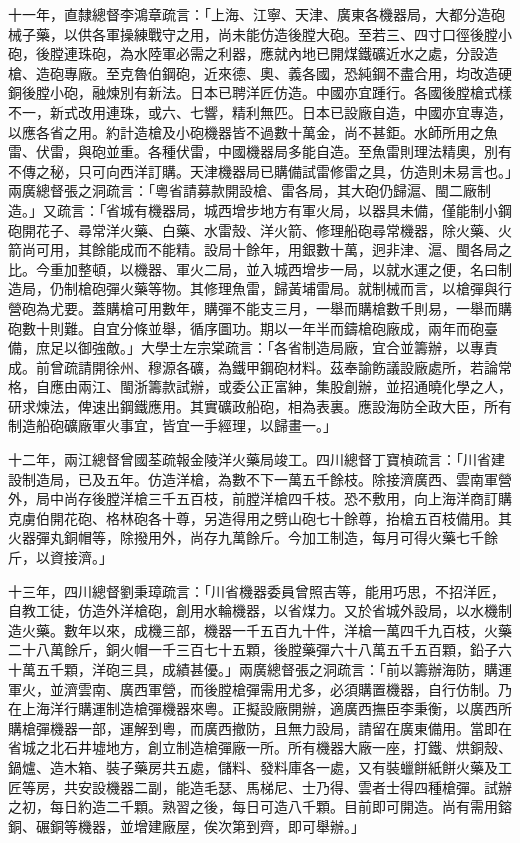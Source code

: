 \begin{pinyinscope}
十一年，直隸總督李鴻章疏言：「上海、江寧、天津、廣東各機器局，大都分造砲械子藥，以供各軍操練戰守之用，尚未能仿造後膛大砲。至若三、四寸口徑後膛小砲，後膛連珠砲，為水陸軍必需之利器，應就內地已開煤鐵礦近水之處，分設造槍、造砲專廠。至克魯伯鋼砲，近來德、奧、義各國，恐純鋼不盡合用，均改造硬銅後膛小砲，融煉別有新法。日本已聘洋匠仿造。中國亦宜踵行。各國後膛槍式樣不一，新式改用連珠，或六、七響，精利無匹。日本已設廠自造，中國亦宜專造，以應各省之用。約計造槍及小砲機器皆不過數十萬金，尚不甚鉅。水師所用之魚雷、伏雷，與砲並重。各種伏雷，中國機器局多能自造。至魚雷則理法精奧，別有不傳之秘，只可向西洋訂購。天津機器局已購備試雷修雷之具，仿造則未易言也。」兩廣總督張之洞疏言：「粵省請募款開設槍、雷各局，其大砲仍歸滬、閩二廠制造。」又疏言：「省城有機器局，城西增步地方有軍火局，以器具未備，僅能制小鋼砲開花子、尋常洋火藥、白藥、水雷殼、洋火箭、修理船砲尋常機器，除火藥、火箭尚可用，其餘能成而不能精。設局十餘年，用銀數十萬，迥非津、滬、閩各局之比。今重加整頓，以機器、軍火二局，並入城西增步一局，以就水運之便，名曰制造局，仍制槍砲彈火藥等物。其修理魚雷，歸黃埔雷局。就制械而言，以槍彈與行營砲為尤要。蓋購槍可用數年，購彈不能支三月，一舉而購槍數千則易，一舉而購砲數十則難。自宜分條並舉，循序圖功。期以一年半而鑄槍砲廠成，兩年而砲臺備，庶足以御強敵。」大學士左宗棠疏言：「各省制造局廠，宜合並籌辦，以專責成。前曾疏請開徐州、穆源各礦，為鐵甲鋼砲材料。茲奉諭飭議設廠處所，若論常格，自應由兩江、閩浙籌款試辦，或委公正富紳，集股創辦，並招通曉化學之人，研求煉法，俾速出鋼鐵應用。其實礦政船砲，相為表裏。應設海防全政大臣，所有制造船砲礦廠軍火事宜，皆宜一手經理，以歸畫一。」

十二年，兩江總督曾國荃疏報金陵洋火藥局竣工。四川總督丁寶楨疏言：「川省建設制造局，已及五年。仿造洋槍，為數不下一萬五千餘枝。除接濟廣西、雲南軍營外，局中尚存後膛洋槍三千五百枝，前膛洋槍四千枝。恐不敷用，向上海洋商訂購克虜伯開花砲、格林砲各十尊，另造得用之劈山砲七十餘尊，抬槍五百枝備用。其火器彈丸銅帽等，除撥用外，尚存九萬餘斤。今加工制造，每月可得火藥七千餘斤，以資接濟。」

十三年，四川總督劉秉璋疏言：「川省機器委員曾照吉等，能用巧思，不招洋匠，自教工徒，仿造外洋槍砲，創用水輪機器，以省煤力。又於省城外設局，以水機制造火藥。數年以來，成機三部，機器一千五百九十件，洋槍一萬四千九百枝，火藥二十八萬餘斤，銅火帽一千三百七十五顆，後膛藥彈六十八萬五千五百顆，鉛子六十萬五千顆，洋砲三具，成績甚優。」兩廣總督張之洞疏言：「前以籌辦海防，購運軍火，並濟雲南、廣西軍營，而後膛槍彈需用尤多，必須購置機器，自行仿制。乃在上海洋行購運制造槍彈機器來粵。正擬設廠開辦，適廣西撫臣李秉衡，以廣西所購槍彈機器一部，運解到粵，而廣西撤防，且無力設局，請留在廣東備用。當即在省城之北石井墟地方，創立制造槍彈廠一所。所有機器大廠一座，打鐵、烘銅殼、鍋爐、造木箱、裝子藥房共五處，儲料、發料庫各一處，又有裝蠟餅紙餅火藥及工匠等房，共安設機器二副，能造毛瑟、馬梯尼、士乃得、雲者士得四種槍彈。試辦之初，每日約造二千顆。熟習之後，每日可造八千顆。目前即可開造。尚有需用鎔銅、碾銅等機器，並增建廠屋，俟次第到齊，即可舉辦。」


\end{pinyinscope}

